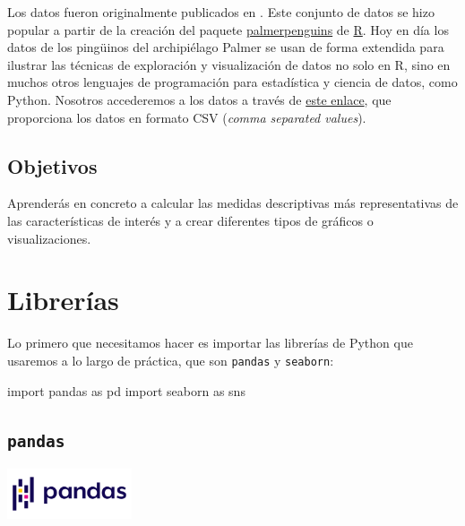 \documentclass[
  a4paper,
  noprof,
  12pt,
  notoc,
  nosols,
  nobib]{mnye}
\newenvironment{Shaded}{\begin{snugshade}}{\end{snugshade}}
\newcommand{\ImportTok}[1]{\textcolor[rgb]{0.00,0.46,0.62}{#1}}
\newcommand{\NormalTok}[1]{\textcolor[rgb]{0.00,0.23,0.31}{#1}}
\theoremstyle{definition}
\theoremstyle{remark}
\begin{document}
Los datos fueron originalmente publicados en \textcite{Gorman2014}. Este
conjunto de datos se hizo popular a partir de la creación del paquete
\href{https://github.com/allisonhorst/palmerpenguins}{palmerpenguins} de
\href{https://www.r-project.org/}{R}. Hoy en día los datos de los
pingüinos del archipiélago Palmer se usan de forma extendida para
ilustrar las técnicas de exploración y visualización de datos no solo en
R, sino en muchos otros lenguajes de programación para estadística y
ciencia de datos, como Python. Nosotros accederemos a los datos a través
de
\href{https://github.com/mwaskom/seaborn-data/blob/master/penguins.csv}{este
enlace}, que proporciona los datos en formato CSV (\emph{comma separated
values}).

\subsection*{Objetivos}\label{objetivos}


Aprenderás en concreto a calcular las medidas descriptivas más
representativas de las características de interés y a crear diferentes
tipos de gráficos o visualizaciones.


\section{Librerías}\label{libreruxedas}

Lo primero que necesitamos hacer es importar las librerías de Python que
usaremos a lo largo de práctica, que son \texttt{pandas} y
\texttt{seaborn}:

\begin{Shaded}
\begin{Highlighting}[]
\ImportTok{import}\NormalTok{ pandas }\ImportTok{as}\NormalTok{ pd}
\ImportTok{import}\NormalTok{ seaborn }\ImportTok{as}\NormalTok{ sns}
\end{Highlighting}
\end{Shaded}

\subsection{\texorpdfstring{\texttt{pandas}}{pandas}}\label{pandas}

\begin{center}
\includegraphics[width=\textwidth,height=4em]{chapters/../img/pandas.png}
\end{center}
\end{document}
